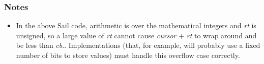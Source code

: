 \subsubsection*{Notes}

\begin{itemize}
\item
In the above Sail code, arithmetic is over the mathematical integers and
\emph{rt} is unsigned, so a large value of \emph{rt} cannot cause
\emph{cursor} $+$ \emph{rt} to wrap around and be less than \emph{cb}.\cbase{}.
Implementations (that, for example, will probably use a fixed number of
bits to store values) must handle this overflow case correctly.
\end{itemize}
